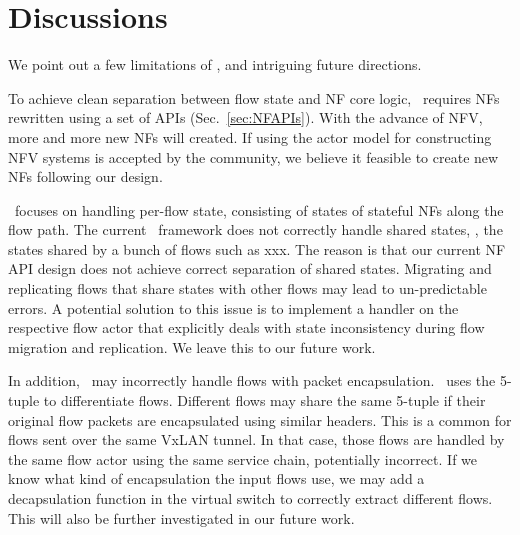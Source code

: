 \section{Discussions}
\label{sec:discussion}

We point out a few limitations of \nfactor, and intriguing future directions.

To achieve clean separation between flow state and NF core logic, \nfactor~requires NFs rewritten using a set of APIs (Sec.~\ref{sec:NFAPIs}). With the advance of NFV, more and more new NFs will created. If using the actor model for constructing NFV systems is accepted by the community, we believe it feasible to create new NFs following our design. %


\nfactor~focuses on handling per-flow state, consisting of states of stateful NFs along the flow path. The current \nfactor~framework does not correctly handle shared states, \ie, the states shared by a bunch of flows such as xxx. The reason is that %
our current NF API design does not achieve correct separation of shared states. Migrating and replicating flows that share states with other flows may lead to un-predictable errors. A potential solution to this issue is to implement a handler on the respective flow actor that explicitly deals with state inconsistency during flow migration and replication. We leave this to our future work.

In addition, \nfactor~may incorrectly handle flows with packet encapsulation. \nfactor~uses the 5-tuple to differentiate flows. Different flows may share the same 5-tuple if their original flow packets are encapsulated using similar headers. This is a common for flows sent over the same VxLAN tunnel. In that case, those flows are handled by the same flow actor using the same service chain, potentially incorrect. If we know what kind of encapsulation the input flows use, we may add a decapsulation function in the virtual switch to correctly extract different flows. This will also be further investigated in our future work.

